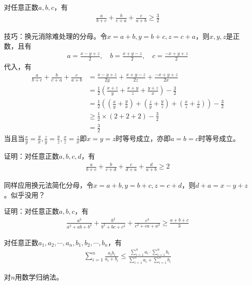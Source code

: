 \begin{example}[Nesbit不等式]
  对任意正数$a,b,c$，有
  \begin{align*}
    \frac{a}{b+c}+\frac{b}{c+a}+\frac{c}{a+b}\ge\frac32
  \end{align*}
\end{example}
技巧：换元消除难处理的分母。令$x=a+b,y=b+c,z=c+a$，则$x,y,z$是正数，且有
\begin{align*}
  a=\frac{x-y+z}2,\quad b=\frac{x+y-z}2,\quad c=\frac{-x+y+z}2
\end{align*}
代入，有
\begin{align*}
  \frac{a}{b+c}+\frac{b}{c+a}+\frac{c}{a+b}
  &= \frac{x-y+z}{2y} + \frac{x+y-z}{2z} + \frac{-x+y+z}{2x}\\
  &= \frac12\left(\frac{x+z}{y} + \frac{x+y}{z} + \frac{y+z}{x}\right)-\frac32\\
  &= \frac12\left( \left(\frac xy + \frac yx\right)
                  +\left(\frac zy + \frac yz\right)
                  +\left(\frac xz + \frac zx\right)
            \right)-\frac32\\
  &\ge \frac12\times ( 2 + 2 + 2) - \frac32\\
  &=\frac32
\end{align*}
当且当$\frac xy=\frac yx, \frac zy=\frac yz, \frac xz=\frac zx$即$x=y=z$时等号成立，亦即$a=b=c$时等号成立。

\begin{question}
  证明：对任意正数$a,b,c,d$，有
  \begin{align*}
    \frac{a}{b+c}+\frac{b}{c+d}+\frac{c}{d+a}+\frac{d}{a+b}\ge 2
  \end{align*}
\end{question}
同样应用换元法简化分母，令$x=a+b,y=b+c,z=c+d$，则$d+a=x-y+z$。{\color{red}似乎没用？}

\begin{question}
  证明：对任意正数$a,b,c$，有
  \begin{align*}
    \frac{a^3}{a^2+ab+b^2}+\frac{b^3}{b^2+bc+c^2}+\frac{c^3}{c^2+ca+a^2}
    \ge
    \frac{a+b+c}{3}
  \end{align*}
\end{question}

\begin{question}
  对任意正数$a_1,a_2,\cdots,a_n,b_1,b_2,\cdots,b_n$，有
  \begin{align*}
    \sum_{i=1}^n\frac{a_ib_i}{a_i+b_i}\le
    \frac{\sum\limits_{i=1}^n a_i \cdot \sum\limits_{i=1}^n b_i}
         {\sum\limits_{i=1}^n a_i + \sum\limits_{i=1}^n b_i}
  \end{align*}
\end{question}
对$n$用数学归纳法。

